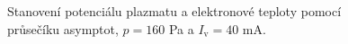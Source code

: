 \documentclass[a4paper,12pt]{article}
\begin{document}
\begin{figure}[h]
	\centering
	\begin{subfigure}[b]{.49\textwidth}
		\centering
	\end{subfigure}
	\begin{subfigure}[b]{.49\textwidth}
		\centering
	\end{subfigure}
	\caption{Stanovení potenciálu plazmatu a elektronové teploty pomocí 
		průsečíku asymptot, $p = 160$ \si{\pascal} a 
	$I_\text{v} = 40$ \si{\milli\ampere}.}
	\label{data0}
\end{figure}
\end{document}
